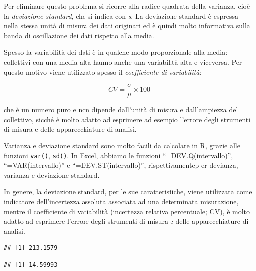 \documentclass[a4paper,12pt,oneside]{book}
\newenvironment{Shaded}{\begin{snugshade}}{\end{snugshade}}
\newcommand{\KeywordTok}[1]{\textcolor[rgb]{0.13,0.29,0.53}{\textbf{#1}}}
\newcommand{\OperatorTok}[1]{\textcolor[rgb]{0.81,0.36,0.00}{\textbf{#1}}}
\newcommand{\NormalTok}[1]{#1}
\begin{document}
Per eliminare questo problema si ricorre alla radice quadrata della
varianza, cioè la \emph{deviazione standard}, che si indica con
\emph{s}. La deviazione standard è espressa nella stessa unità di misura
dei dati originari ed è quindi molto informativa sulla banda di
oscillazione dei dati rispetto alla media.

Spesso la variabilità dei dati è in qualche modo proporzionale alla
media: collettivi con una media alta hanno anche una variabilità alta e
viceversa. Per questo motivo viene utilizzato spesso il
\emph{coefficiente di variabilità}:

\[CV = \frac{\sigma }{\mu } \times 100\]

che è un numero puro e non dipende dall'unità di misura e dall'ampiezza
del collettivo, sicché è molto adatto ad esprimere ad esempio l'errore
degli strumenti di misura e delle apparecchiature di analisi.

Varianza e deviazione standard sono molto facili da calcolare in R,
grazie alle funzioni \texttt{var()}, \texttt{sd()}. In Excel, abbiamo le
funzioni ``=DEV.Q(intervallo)'', ``=VAR(intervallo)'' e
``=DEV.ST(intervallo)'', rispettivamentep er devianza, varianza e
deviazione standard.

In genere, la deviazione standard, per le sue caratteristiche, viene
utilizzata come indicatore dell'incertezza assoluta associata ad una
determinata misurazione, mentre il coefficiente di variabilità
(incertezza relativa percentuale; CV), è molto adatto ad esprimere
l'errore degli strumenti di misura e delle apparecchiature di analisi.

\begin{Shaded}
\end{Shaded}

\begin{verbatim}
## [1] 213.1579
\end{verbatim}

\begin{Shaded}
\end{Shaded}

\begin{verbatim}
## [1] 14.59993
\end{verbatim}
\end{document}
